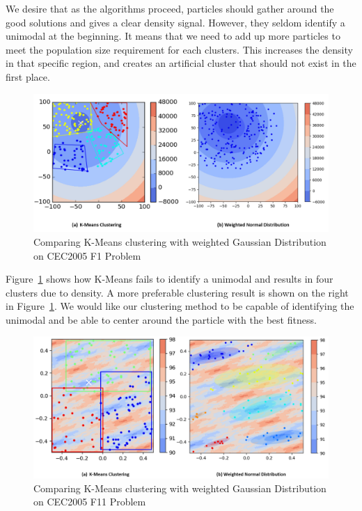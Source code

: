 We desire that as the algorithms proceed, particles should gather around the good solutions and gives a clear density signal.
However, they seldom identify a unimodal at the beginning.
It means that we need to add up more particles to meet the population size requirement for each clusters.
This increases the density in that specific region, and creates an artificial cluster that should not exist in the first place.

\begin{figure} 
\centering
\includegraphics[width=\textwidth]{Clustering_comparison} 
\caption{Comparing K-Means clustering with weighted Gaussian Distribution on CEC2005 F1 Problem}\label{fig:Clustering_comparison}
\end{figure}

Figure~\ref{fig:Clustering_comparison} shows how K-Means fails to identify a unimodal and results in four clusters due to density.
A more preferable clustering result is shown on the right in Figure~\ref{fig:Clustering_comparison}.
We would like our clustering method to be capable of identifying the unimodal 
and be able to center around the particle with the best fitness.

\begin{figure}
\centering
\includegraphics[width=\textwidth]{Clustering_comparison_F11}
\caption{Comparing K-Means clustering with weighted Gaussian Distribution on CEC2005 F11 Problem}\label{fig:Clustering_comparison_F11}
\end{figure}

